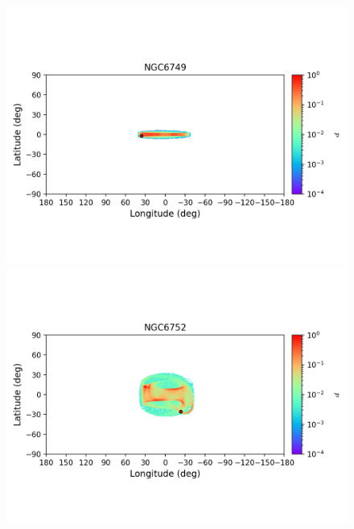\begin{figure}
\begin{center}
                \includegraphics[clip=true, trim = 0mm 20mm 0mm 10mm, width=1\columnwidth]{images/error_plots_NGC6749.png}
                \includegraphics[clip=true, trim = 0mm 20mm 0mm 10mm, width=1\columnwidth]{images/error_plots_NGC6752.png}
                

\end{center}
\end{figure}
